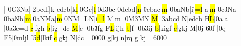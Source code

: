   \ifx\mxversion\undefined\else\toctfin\fi \enotes
\barre\notes{}\soupir|\enotes
\temps\notes\islurd0G\dqb3Na|\hpause\enotes
\temps\notes\qqb2bcdf|\hu k\enotes
\barre\notes{}edcb|\lh k\hl l\enotes
\temps\notes\tslur0G\ql c\sk|\hl l\enotes
\temps\notes\Ilegu0d\dqb3bc\enotes
\Alaligne\notes\qqB0dcbd|\hl n\enotes
\temps\notes\qqB0cbac|\hl m\enotes
\barre\notes\qqB0baNb|\lh i\zh j\hl{=l}\enotes
\temps\notes{}\ql a\sk|\hl m\enotes
\temps\notes\Ilegu0c\dqb3Na|\enotes
\barre\notes\qqB0baNb|\hl m\enotes
\temps\notes\qqB0aNMa|\hl m\enotes
\barre\notes\qqB0NM{=L}N|\lh i\hl{=l}\enotes
\temps\notes{}\ql M\sk|\ql m\enotes
\temps\notes\soupir|\Ilegl0M\dqh3MN\enotes
\def\atnextline{\advancebottom{-2\Interligne}}%
\Alaligne\notes{}\hl M\relax
   |\qqh3abcd\enotes
\temps\notes{}\zh N|edcb\enotes
\barre\notes\zh H\hl L|\ifx\mxversion\undefined{}\else\tslur0a\fi
 \qu a\sk\enotes
\temps\notes|\Ilegl0a\dqh3c{=d}\enotes
\temps\notes{}\hl c|fgh\enotes
\barre\notes{}\hl b|ig{_d}c\enotes
\temps\notes{}\hl M|\qu c\sk\enotes
\temps\notes|\Ilegl0b\dqh3fg\enotes
\barre\notes\zh F\hl L|ijh\enotes
\temps\notes{}\hl b|\qu f\sk\enotes
\temps\notes|\Ilegl0b\dqh3ij\enotes
\Alaligne\notes{}\hl b|kigf\enotes
\temps\notes{}\hl c|gkj\enotes
\barre\notes{}\hu M|\ibu0j{-6}\qh0f\enotes
\temps\notes{}|\Ilegu0q\enotes
\Arpg F5\notes{}|\qqB0mljl\enotes
\barre\arpg I5\notes{}\hl d|lkif\enotes
\temps\notes\Soufflcr{}\hl c|gkj\enotes
\barre\notes{}\ql N|dc\enotes
\cleftoksi={{0}{0}{0}{0}}\zchangeclefs
\nspace\notes{}\qu g|kj\enotes
\temps\notes{}\ql n|rq\enotes
\temps\notes{}\qu g|kj\enotes
\cleftoksi={{6}{0}{0}{0}}\zchangeclefs
\def\motif#1#2#3{\notes\ibu0F4\boqh F\relax
   |\sk{\advance\transpose by 3\relax\ibu1{#3}6}\zq{#1}\zq{#2}\qh1{#3}\relax
   \tbl0\zq{#1}\zq{#2}\qb0{#3}\tbu1{\advance\transpose by 7\relax
   \zq{#1}\zq{#2}\qh1{#3}}\enotes}%
